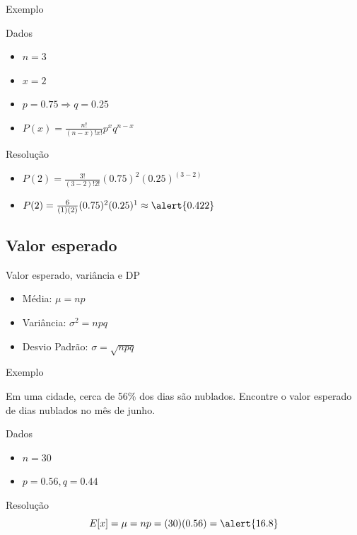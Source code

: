 \documentclass{beamer}
\begin{document}
\begin{frame}{Exemplo}
  \begin{block}{Dados}
    \begin{itemize}
    \item $n = 3$
    \item $x = 2$
    \item $p = 0.75 \Rightarrow q = 0.25$
    \item $P(x) = \frac{n!}{(n-x)!x!}p^x q^{n-x}$
    \end{itemize}
  \end{block}
  \begin{block}{Resolução}
    \begin{itemize}
    \item $P(2) = \frac{3!}{(3-2)!2!}(0.75)^{2} (0.25)^{(3-2)}$
    \item $P(2) = \frac{6}{(1)(2)}(0.75)^{2} (0.25)^{1} \approx \alert{0.422}$
    \end{itemize}
  \end{block}
\end{frame}

\subsection{Valor esperado}

\begin{frame}{Valor esperado, variância e DP}
  \begin{itemize}
  \item Média: $\mu = np$
  \item Variância: $\sigma^2 = npq$
  \item Desvio Padrão: $\sigma =\sqrt{npq}$
  \end{itemize}
\end{frame}

\begin{frame}{Exemplo}
  \begin{example}
    Em uma cidade, cerca de 56\% dos dias são nublados.
    Encontre o valor esperado de dias nublados no mês de junho.
  \end{example}
  \begin{block}{Dados}
    \begin{itemize}
    \item $n = 30$
    \item $p = 0.56, q = 0.44$
    \end{itemize}
  \end{block}
  \begin{block}{Resolução}
    \begin{displaymath}
      E[x] = \mu = np = (30)(0.56) = \alert{16.8}
    \end{displaymath}
  \end{block}
\end{frame}
\end{document}
